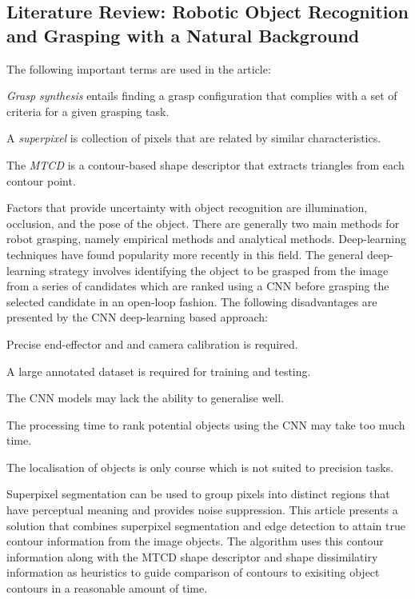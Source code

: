 \subsection{Literature Review: Robotic Object Recognition and Grasping with a Natural Background \cite{Wei2020}}

The following important terms are used in the article:

\begin{compactitem}
    \item \textit{Grasp synthesis} entails finding a grasp configuration that complies with a set of criteria for a given grasping task.
    \item A \textit{superpixel} is collection of pixels that are related by similar characteristics.
    \item The \textit{\ac{MTCD}} is a contour-based shape descriptor that extracts triangles from each contour point. \cite{Yang2016}
\end{compactitem}

Factors that provide uncertainty with object recognition are illumination, occlusion, and the pose of the object. There are generally two main methods for robot grasping, namely empirical methods and analytical methods. Deep-learning techniques have found popularity more recently in this field. The general deep-learning strategy involves identifying the object to be grasped from the image from a series of candidates which are ranked using a \ac{CNN} before grasping the selected candidate in an open-loop fashion. The following disadvantages are presented by the \ac{CNN} deep-learning based approach:

\begin{compactitem}
    \item Precise end-effector and and camera calibration is required.
    \item A large annotated dataset is required for training and testing.
    \item The \ac{CNN} models may lack the ability to generalise well.
    \item The processing time to rank potential objects using the \ac{CNN} may take too much time.
    \item The localisation of objects is only course which is not suited to precision tasks.
\end{compactitem}

Superpixel segmentation can be used to group pixels into distinct regions that have perceptual meaning and provides noise suppression. This article presents a solution that combines superpixel segmentation and edge detection to attain true contour information from the image objects. The algorithm uses this contour information along with the \ac{MTCD} shape descriptor and shape dissimilatiry information as heuristics to guide comparison of contours to exisiting object contours in a reasonable amount of time.

